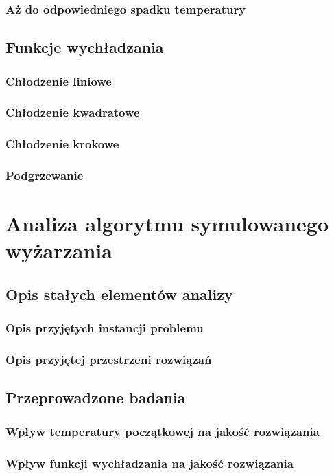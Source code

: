 \subsection{Aż do odpowiedniego spadku temperatury}

\section{Funkcje wychładzania}
\subsection{Chłodzenie liniowe}
\subsection{Chłodzenie kwadratowe}
\subsection{Chłodzenie krokowe}
\subsection{Podgrzewanie}


\chapter{Analiza algorytmu symulowanego wyżarzania}
\section{Opis stałych elementów analizy}
\subsection{Opis przyjętych instancji problemu}
\subsection{Opis przyjętej przestrzeni rozwiązań}
\section{Przeprowadzone badania}
\subsection{Wpływ temperatury początkowej na jakość rozwiązania}
\subsection{Wpływ funkcji wychładzania na jakość rozwiązania}
